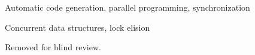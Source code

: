 \documentclass[pldi]{sigplanconf-pldi15}
\begin{document}

\terms
Automatic code generation, parallel programming, synchronization

\keywords
Concurrent data structures, lock elision








\appendix



\acks

Removed for blind review.








%

\end{document}
